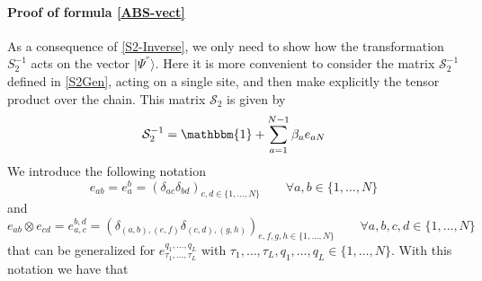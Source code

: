\documentclass[10pt]{article}
\numberwithin{equation}{section}
\numberwithin{equation}{subsection}
\begin{document}
\paragraph{Proof of formula \eqref{ABS-vect}} As a consequence of \eqref{S2-Inverse}, we only need to show how the transformation $S_{2}^{-1}$ acts on the vector $|\Psi^{''}\rangle$. Here it is more convenient to consider the matrix $\mathcal{S}_{2}^{-1}$ defined in \eqref{S2Gen}, acting on a single site, and then make explicitly the tensor product over the chain. This matrix $\mathcal{S}_{2}$ is given by 
\begin{equation}
   \mathcal{S}_{2}^{-1}=\mathbbm{1}+\sum_{a=1}^{N-1}\beta_{a}e_{aN}
\end{equation}
We introduce the following notation
\begin{equation}\label{notation1}
    e_{ab}=e_{a}^{b}=\left(\delta_{ac}\delta_{bd}\right)_{c,d\in\{1,\ldots,N\}}\qquad \forall a,b\in \{1,\ldots,N\}
\end{equation}
and 
\begin{equation}\label{notation2}
    e_{ab}\otimes e_{cd}=e_{a,c}^{b,d}=\left(\delta_{(a,b),(e,f)}\delta_{(c,d),(g,h)}\right)_{e,f,g,h\in \{1,\ldots,N\}}\qquad \forall a,b,c,d\in \{1,\ldots,N\}
    \end{equation}
    that can be generalized for $e_{\tau_{1},\ldots,\tau_{L}}^{q_{1},\ldots,q_{L}}$ with $\tau_{1},\ldots,\tau_{L},q_{1},\ldots,q_{L}\in \{1,\ldots,N\}$. With this notation we have that
    
\end{document}
